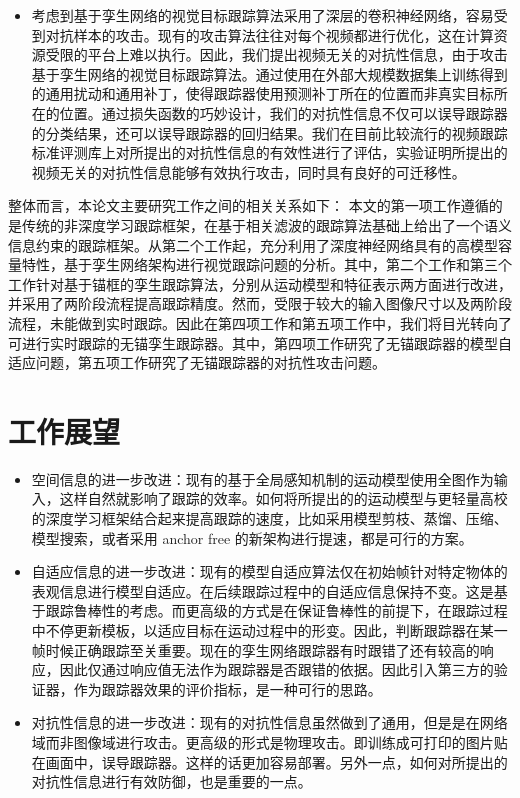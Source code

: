 \begin{itemize}
\item 考虑到基于孪生网络的视觉目标跟踪算法采用了深层的卷积神经网络，容易受到对抗样本的攻击。现有的攻击算法往往对每个视频都进行优化，这在计算资源受限的平台上难以执行。因此，我们提出视频无关的对抗性信息，由于攻击基于孪生网络的视觉目标跟踪算法。通过使用在外部大规模数据集上训练得到的通用扰动和通用补丁，使得跟踪器使用预测补丁所在的位置而非真实目标所在的位置。通过损失函数的巧妙设计，我们的对抗性信息不仅可以误导跟踪器的分类结果，还可以误导跟踪器的回归结果。我们在目前比较流行的视频跟踪标准评测库上对所提出的对抗性信息的有效性进行了评估，实验证明所提出的视频无关的对抗性信息能够有效执行攻击，同时具有良好的可迁移性。
\end{itemize}
整体而言，本论文主要研究工作之间的相关关系如下：
本文的第一项工作遵循的是传统的非深度学习跟踪框架，在基于相关滤波的跟踪算法基础上给出了一个语义信息约束的跟踪框架。从第二个工作起，充分利用了深度神经网络具有的高模型容量特性，基于孪生网络架构进行视觉跟踪问题的分析。其中，第二个工作和第三个工作针对基于锚框的孪生跟踪算法，分别从运动模型和特征表示两方面进行改进，并采用了两阶段流程提高跟踪精度。然而，受限于较大的输入图像尺寸以及两阶段流程，未能做到实时跟踪。因此在第四项工作和第五项工作中，我们将目光转向了可进行实时跟踪的无锚孪生跟踪器。其中，第四项工作研究了无锚跟踪器的模型自适应问题，第五项工作研究了无锚跟踪器的对抗性攻击问题。

\section{工作展望}
\begin{itemize}
\item 空间信息的进一步改进：现有的基于全局感知机制的运动模型使用全图作为输入，这样自然就影响了跟踪的效率。如何将所提出的的运动模型与更轻量高校的深度学习框架结合起来提高跟踪的速度，比如采用模型剪枝、蒸馏、压缩、模型搜索，或者采用 anchor free 的新架构进行提速，都是可行的方案。
\item 自适应信息的进一步改进：现有的模型自适应算法仅在初始帧针对特定物体的表观信息进行模型自适应。在后续跟踪过程中的自适应信息保持不变。这是基于跟踪鲁棒性的考虑。而更高级的方式是在保证鲁棒性的前提下，在跟踪过程中不停更新模板，以适应目标在运动过程中的形变。因此，判断跟踪器在某一帧时候正确跟踪至关重要。现在的孪生网络跟踪器有时跟错了还有较高的响应，因此仅通过响应值无法作为跟踪器是否跟错的依据。因此引入第三方的验证器，作为跟踪器效果的评价指标，是一种可行的思路。
\item 对抗性信息的进一步改进：现有的对抗性信息虽然做到了通用，但是是在网络域而非图像域进行攻击。更高级的形式是物理攻击。即训练成可打印的图片贴在画面中，误导跟踪器。这样的话更加容易部署。另外一点，如何对所提出的对抗性信息进行有效防御，也是重要的一点。
\end{itemize}